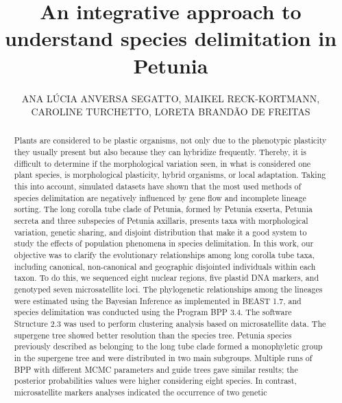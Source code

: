 \documentclass[twoside]{article}
\title{\vspace{-15mm}\fontsize{24pt}{10pt}\selectfont\textbf{ An integrative approach to understand species delimitation in Petunia }} %
\author{ ANA L\'UCIA ANVERSA SEGATTO, MAIKEL RECK-KORTMANN, CAROLINE TURCHETTO, LORETA BRAND\~AO DE FREITAS }
\affil{ UNIVERSIDADE FEDERAL DO RIO GRANDE DO SUL }
\date{}
\begin{document}
  
  
  \maketitle %
  
  
  \thispagestyle{fancy} %
  
  
  \begin{abstract}
  Plants are considered to be plastic organisms,  not only due to the phenotypic
plasticity they usually present but also because they can hybridize frequently.
Thereby,  it is difficult to determine if the morphological variation seen,  in what is
considered one plant species,  is morphological plasticity,  hybrid organisms,  or
local adaptation. Taking this into account,  simulated datasets have shown that
the most used methods of species delimitation are negatively influenced by
gene flow and incomplete lineage sorting. The long corolla tube clade of
Petunia,  formed by Petunia exserta,  Petunia secreta and three subspecies of
Petunia axillaris,  presents taxa with morphological variation,  genetic sharing, 
and disjoint distribution that make it a good system to study the effects of
population phenomena in species delimitation. In this work,  our objective was to
clarify the evolutionary relationships among long corolla tube taxa,  including
canonical,  non-canonical and geographic disjointed individuals within each
taxon. To do this,  we sequenced eight nuclear regions,  five plastid DNA
markers,  and genotyped seven microsatellite loci. The phylogenetic
relationships among the lineages were estimated using the Bayesian Inference
as implemented in BEAST 1.7,  and species delimitation was conducted using
the Program BPP 3.4. The software Structure 2.3 was used to perform
clustering analysis based on microsatellite data. The supergene tree showed
better resolution than the species tree. Petunia species previously described as
belonging to the long tube clade formed a monophyletic group in the supergene
tree and were distributed in two main subgroups. Multiple runs of BPP with
different MCMC parameters and guide trees gave similar results; the posterior
probabilities values were higher considering eight species. In contrast, 
microsatellite markers analyses indicated the occurrence of two genetic

\end{abstract}
\end{document}
